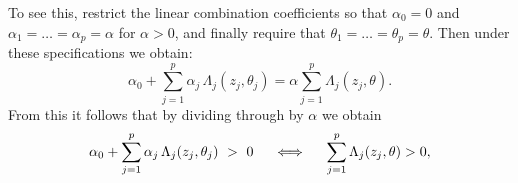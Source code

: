 To see this, restrict the linear combination coefficients so that $\alpha_0 = 0$
and $\alpha_1 = \dots = \alpha_p = \alpha$ for $\alpha > 0$, and finally require
that $\theta_1 = \dots = \theta_p = \theta$.  Then under these specifications we
obtain:
\begin{equation}
  \label{eq:composite-is-distance}
  \alpha_0 + \sum_{j=1}^p \alpha_j \, \Lambda_j (z_j, \theta_j)
  = \alpha \sum_{j=1}^p \Lambda_j (z_j, \theta).
\end{equation}
From this it follows that by dividing through by $\alpha$ we obtain
\begin{equation}
  \label{eq:boundary-equivalence}
  \alpha_0 + \sum_{j=1}^p \alpha_j \, \Lambda_j (z_j, \theta_j) ~>~ 0
  \hspace{5mm} \Longleftrightarrow \hspace{5mm}
  \sum_{j=1}^p \Lambda_j (z_j, \theta) > 0,
\end{equation}
